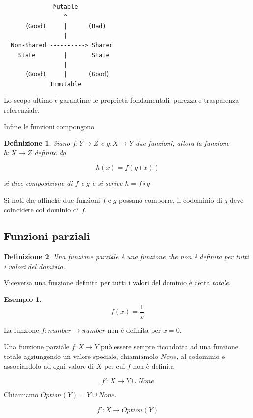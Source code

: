 \documentclass[12pt]{article}
\newtheorem{definition}{Definizione}[section]
\newtheorem{example}{Esempio}[section]
\begin{document}
\begin{verbatim}
              Mutable
                 ^
      (Good)     |      (Bad)
                 |
  Non-Shared ----------> Shared
    State        |       State
                 |
      (Good)     |      (Good)
             Immutable
\end{verbatim}

Lo scopo ultimo è garantirne le proprietà fondamentali: purezza e trasparenza referenziale.

Infine le funzioni compongono

\begin{definition}
Siano $f: Y \rightarrow Z$ e $g: X \rightarrow Y$ due funzioni, allora la funzione $h: X \rightarrow Z$ definita da

$$
h(x) = f(g(x))
$$

si dice \emph{composizione} di $f$ e $g$ e si scrive $h = f \circ g$

\end{definition}

Si noti che affinchè due funzioni $f$ e $g$ possano comporre, il codominio di $g$ deve coincidere col dominio di $f$.

\subsection{Funzioni parziali}

\begin{definition}
Una funzione \emph{parziale} è una funzione che non è definita per tutti i valori del dominio.
\end{definition}

Viceversa una funzione definita per tutti i valori del dominio è detta \emph{totale}.

\begin{example}
$$
f(x) = \frac{1}{x}
$$
\end{example}

La funzione $f: number \rightarrow number$ non è definita per $x = 0$.

Una funzione parziale $f: X \rightarrow Y$ può essere sempre ricondotta ad una funzione totale aggiungendo un valore speciale,
chiamiamolo $None$, al codominio e associandolo ad ogni valore di $X$ per cui $f$ non è definita

$$
f': X \rightarrow Y \cup None
$$

Chiamiamo $Option(Y) = Y \cup None$.

$$
f': X \rightarrow Option(Y)
$$
\end{document}
